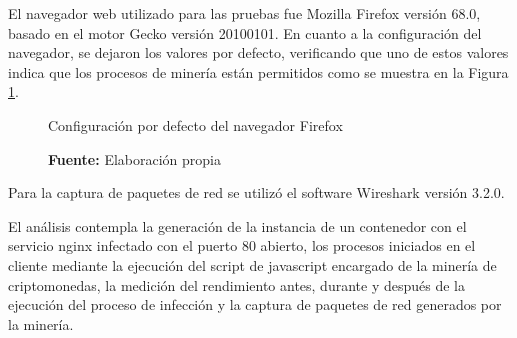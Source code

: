 \documentclass[../main/main.tex]{subfiles}
\begin{document}
  El navegador web utilizado para las pruebas fue Mozilla Firefox versión 68.0, basado en el motor Gecko versión 20100101. En cuanto a la configuración del navegador, se dejaron los valores por defecto, verificando que uno de estos valores indica que los procesos de minería están permitidos como se muestra en la Figura \ref{fig:firefox_config_before}.

  \begin{figure}[ht]
    \centering
    \caption{Configuración por defecto del navegador Firefox}
    \caption*{\textbf{Fuente:} Elaboración propia}
    \label{fig:firefox_config_before}
  \end{figure}

  Para la captura de paquetes de red se utilizó el software Wireshark versión 3.2.0.

  El análisis contempla la generación de la instancia de un contenedor con el servicio nginx infectado con el puerto 80 abierto, los procesos iniciados en el cliente mediante la ejecución del script de javascript encargado de la minería de criptomonedas, la medición del rendimiento antes, durante y después de la ejecución del proceso de infección y la captura de paquetes de red generados por la minería.
\end{document}
